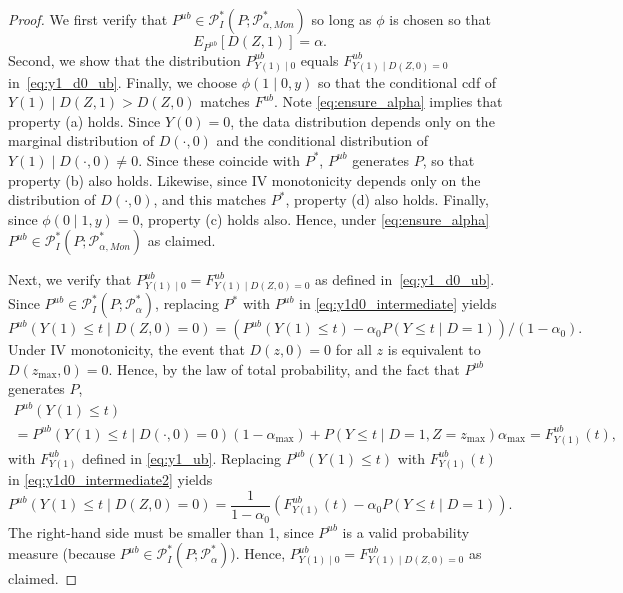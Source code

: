 \documentclass[12pt]{article}%
\theoremstyle{definition}
\newcommand\1{\operatorname{I}\indicatorfence}
\begin{document}
\begin{appendices}
\begin{proof}
  We first verify that
  $P^{ub}\in \mathcal{P}^*_{I}(P; \mathcal{P}^*_{\alpha, Mon})$ so long as
  $\phi$ is chosen so that
  \begin{equation}
    E_{P^{ub}}[D(Z,1)]=\alpha\label{eq:ensure_alpha}.
  \end{equation}
  Second, we show that the distribution $P^{ub}_{Y(1)\mid 0}$ equals
  $F^{ub}_{Y(1)\mid D(Z,0)=0}$ in~\cref{eq:y1_d0_ub}. Finally, we choose
  $\phi(1\mid 0,y)$ so that the conditional cdf of $Y(1)\mid D(Z,1)>D(Z,0)$
  matches $F^{ub}$. Note \cref{eq:ensure_alpha} implies that property (a) holds.
  Since $Y(0)=0$, the data distribution depends only on the marginal
  distribution of $D(\cdot, 0)$ and the conditional distribution of
  $Y(1)\mid D(\cdot, 0)\neq 0$. Since these coincide with $P^{*}$, $P^{ub}$
  generates $P$, so that property (b) also holds. Likewise, since IV
  monotonicity depends only on the distribution of $D(\cdot, 0)$, and this
  matches $P^{*}$, property (d) also holds. Finally, since $\phi(0\mid 1,y)=0$,
  property (c) holds also. Hence, under \cref{eq:ensure_alpha}
  $P^{ub}\in\mathcal{P}^*_{I}(P; \mathcal{P}^*_{\alpha, Mon})$ as claimed.

  Next, we verify that $P^{ub}_{Y(1)\mid 0}=F^{ub}_{Y(1)\mid D(Z,0)=0}$ as
  defined in~\cref{eq:y1_d0_ub}. Since
  $P^{ub}\in\mathcal{P}^*_{I}(P; \mathcal{P}^*_{\alpha})$, replacing $P^{*}$
  with $P^{ub}$ in \cref{eq:y1d0_intermediate} yields
  \begin{equation}\label{eq:y1d0_intermediate2}
        P^{ub}(Y(1) \leq t\mid D(Z,0)=0) = (P^{ub}(Y(1) \leq t) -\alpha_{0} P(Y \leq t \mid D=1)) / (1-\alpha_{0}).
  \end{equation}
  Under IV monotonicity, the event that $D(z,0)=0$ for all $z$ is equivalent to
  $D(z_{\max},0)=0$. Hence, by the law of total probability, and the fact that
  $P^{ub}$ generates $P$,
  \begin{multline*}
    P^{ub}(Y(1)\leq t)\\
    = P^{ub}(Y(1)\leq t\mid D(\cdot, 0)=0)(1-\alpha_{\max})+
    P(Y\leq t\mid D=1,Z=z_{\max})\alpha_{\max}=F_{Y(1)}^{ub}(t),
  \end{multline*}
  with $F_{Y(1)}^{ub}$ defined in \cref{eq:y1_ub}. Replacing
  $P^{ub}(Y(1)\leq t)$ with $F_{Y(1)}^{ub}(t)$ in \cref{eq:y1d0_intermediate2}
  yields
  \begin{equation*}
    P^{ub}(Y(1) \leq t\mid D(Z,0)=0) = \frac{1}{1-\alpha_{0}}(F_{Y(1)}^{ub}(t) -\alpha_{0} P(Y \leq t \mid D=1)).
  \end{equation*}
  The right-hand side must be smaller than 1, since $P^{ub}$ is a valid
  probability measure (because
  $P^{ub}\in\mathcal{P}^*_{I}(P; \mathcal{P}^*_{\alpha})$). Hence,
  $P^{ub}_{Y(1)\mid 0}=F^{ub}_{Y(1)\mid D(Z,0)=0}$ as claimed.


\end{proof}
\end{appendices}
\end{document}
